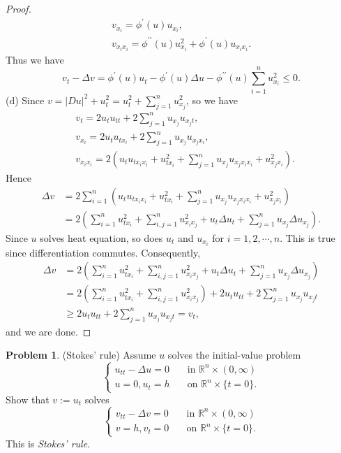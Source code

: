 \documentclass[hyperref,UTF8,12pt]{article}
\numberwithin{equation}{subsection}
\theoremstyle{plain}
\theoremstyle{definition}
\newtheorem{problem}{Problem}
\numberwithin{theorem}{section}
\numberwithin{lemma}{section}
\numberwithin{proposition}{section}
\numberwithin{remark}{section}
\numberwithin{corollary}{section}
\numberwithin{definition}{section}
\numberwithin{problem}{section}
\numberwithin{example}{section}
\newcommand{\dis}{\displaystyle}
\newcommand{\mr}{\mathbb{R}}
\renewcommand{\leq}{\leqslant}
\renewcommand{\geq}{\geqslant}
\begin{document}
\begin{proof}
\[\begin{gathered}
	v_{x_i}=\phi^\prime(u)u_{x_i},\\
	v_{x_ix_i}=\phi^{\prime\prime}(u)u_{x_i}^2+\phi^\prime(u)u_{x_ix_i}.
\end{gathered}\]Thus we have
\[v_t-\Delta v=\phi^\prime(u)u_t-\phi^\prime(u)\Delta u-\phi^{\prime\prime}(u) \sum_{i=1}^nu_{x_i}^2\leq0.\]
(d) Since $v=|Du|^2+u_t^2=u_t^2+\dis\sum_{j=1}^nu_{x_j}^2$, so we have \[\begin{aligned}&v_t=2u_tu_{tt}+2\sum_{j=1}^nu_{x_j}u_{x_jt},\\&v_{x_i}=2u_tu_{tx_i}+2\sum_{j=1}^nu_{x_j}u_{x_jx_i},\\&v_{x_ix_i}=2\left(u_tu_{tx_ix_i}+u_{tx_i}^2+\sum_{j=1}^nu_{x_j}u_{x_jx_ix_i}+u_{x_jx_i}^2\right).\end{aligned}\]Hence\[\begin{aligned}
	\Delta v&=2\sum_{i=1}^n\left(u_tu_{tx_ix_i}+u_{tx_i}^2+ \sum_{j=1}^nu_{x_j}u_{x_j x_ix_i}+u_{x_j x_i}^2\right)\\
	&=2\left(\sum_{i=1}^nu_{tx_i}^2+\sum_{i,j=1}^nu_{x_ix_j}^2+u_t\Delta u_t+\sum_{j=1}^nu_{x_j}\Delta u_{x_j}\right).
\end{aligned}\]Since $u$ solves heat equation, so does $u_t$ and $u_{x_i}$ for $i=1,2, \cdots,n$. This is true since differentiation commutes. Consequently,\[\begin{aligned}
	\Delta v&=2\left(\sum_{i=1}^nu_{tx_i}^2+\sum_{i,j=1}^nu_{x_ix_j}^2+u_t\Delta u_t+\sum_{j=1}^nu_{x_j}\Delta u_{x_j}\right)\\
	&=2\left(\sum_{i=1}^n u_{t x_i}^2+\sum_{i, j=1}^nu_{x_ix_j}^2\right)+2u_t u_{tt}+2\sum_{j=1}^nu_{x_j}u_{x_jt}\\
	&\geq2u_tu_{tt}+2\sum_{j=1}^nu_{x_j}u_{x_jt}=v_t,
\end{aligned}\]and we are done.
\end{proof}
\begin{problem}
(Stokes' rule) Assume $u$ solves the initial-value problem
\[\left\{\begin{aligned}
	u_{tt}-\Delta u=0&\quad\text{in } \mr^n\times(0,\infty)\\
	u=0,u_t=h&\quad\text{on } \mr^n\times\{t=0\}.
\end{aligned}\right.\]
Show that $v:=u_t$ solves
\[\left\{\begin{aligned}
	v_{tt}-\Delta v=0&\quad\text{in } \mr^n\times(0,\infty)\\
	v=h,v_t=0&\quad\text{on } \mr^n\times\{t=0\}.
\end{aligned}\right.\]
This is \textit{Stokes' rule}.
\end{problem}
\end{document}
